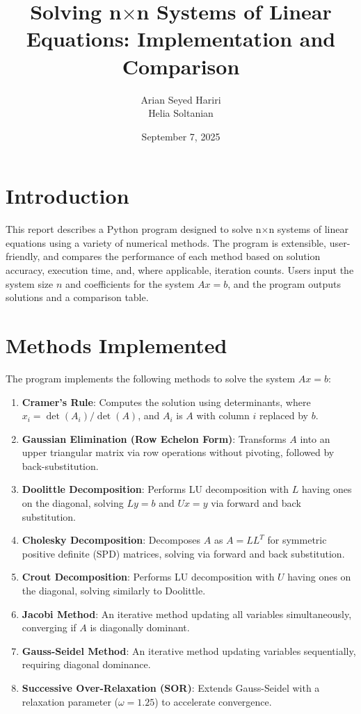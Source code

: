 \documentclass[12pt]{article}
\begin{document}
\title{Solving n$\times$n Systems of Linear Equations: Implementation and Comparison}
\author{Arian Seyed Hariri \\ Helia Soltanian}
\date{September 7, 2025}
\maketitle

\section{Introduction}
This report describes a Python program designed to solve n$\times$n systems of linear equations using a variety of numerical methods. The program is extensible, user-friendly, and compares the performance of each method based on solution accuracy, execution time, and, where applicable, iteration counts. Users input the system size $n$ and coefficients for the system $Ax = b$, and the program outputs solutions and a comparison table.

\section{Methods Implemented}
The program implements the following methods to solve the system $Ax = b$:

\begin{enumerate}[label=\arabic*.]
    \item \textbf{Cramer's Rule}: Computes the solution using determinants, where $x_i = \det(A_i)/\det(A)$, and $A_i$ is $A$ with column $i$ replaced by $b$.
    \item \textbf{Gaussian Elimination (Row Echelon Form)}: Transforms $A$ into an upper triangular matrix via row operations without pivoting, followed by back-substitution.
    \item \textbf{Doolittle Decomposition}: Performs LU decomposition with $L$ having ones on the diagonal, solving $Ly = b$ and $Ux = y$ via forward and back substitution.
    \item \textbf{Cholesky Decomposition}: Decomposes $A$ as $A = LL^T$ for symmetric positive definite (SPD) matrices, solving via forward and back substitution.
    \item \textbf{Crout Decomposition}: Performs LU decomposition with $U$ having ones on the diagonal, solving similarly to Doolittle.
    \item \textbf{Jacobi Method}: An iterative method updating all variables simultaneously, converging if $A$ is diagonally dominant.
    \item \textbf{Gauss-Seidel Method}: An iterative method updating variables sequentially, requiring diagonal dominance.
    \item \textbf{Successive Over-Relaxation (SOR)}: Extends Gauss-Seidel with a relaxation parameter ($\omega = 1.25$) to accelerate convergence.
\end{enumerate}
\end{document}
